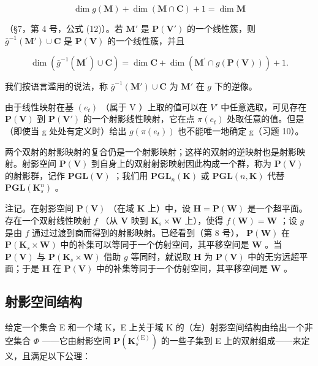 \[
\dim g (\mathbf {M}) + \dim (\mathbf {M} \cap \mathbf {C}) + 1 = \dim \mathbf {M}\tag{7}
\]

（§7，第 4 号，公式 (12)）。若 \(\mathbf{M}'\) 是 \(\mathbf{P}(\mathbf{V}')\) 的一个线性簇，则 \(\bar{g}^{-1}(\mathbf{M}') \cup \mathbf{C}\) 是 \(\mathbf{P}(\mathbf{V})\) 的一个线性簇，并且

\[
\dim (\bar {g} ^ {- 1} (\mathbf {M} ^ {\prime}) \cup \mathbf {C}) = \dim \mathbf {C} + \dim (\mathbf {M} ^ {\prime} \cap g (\mathbf {P} (\mathbf {V}))) + 1.\tag{8}
\]

我们按语言滥用的说法，称 \(\bar{g}^{-1}(\mathbf{M}') \cup \mathbf{C}\) 为 \(\mathbf{M}'\) 在 \(g\) 下的逆像。

由于线性映射在基 \((e_{t})\) （属于 V ）上取的值可以在 \(V'\) 中任意选取，可见存在 \(\mathbf{P}(\mathbf{V})\) 到 \(\mathbf{P}(\mathbf{V}')\) 的一个射影线性映射，它在点 \(\pi(e_{t})\) 处取任意的值。但是（即使当 g 处处有定义时）给出 \(g(\pi(e_{t}))\) 也不能唯一地确定 g（习题 10）。

两个双射的射影映射的复合仍是一个射影映射；这样的双射的逆映射也是射影映射。射影空间 \(\mathbf{P}(\mathbf{V})\) 到自身上的双射射影映射因此构成一个群，称为 \(\mathbf{P}(\mathbf{V})\) 的射影群，记作 \(\mathbf{PGL}(\mathbf{V})\) ；我们用 \(\mathbf{PGL}_{n}(\mathbf{K})\) 或 \(\mathbf{PGL}(n,\mathbf{K})\) 代替 \(\mathbf{PGL}(\mathbf{K}_{s}^{n})\) 。

注记。在射影空间 \(\mathbf{P}(\mathbf{V})\) （在域 \(\mathbf{K}\) 上）中，设 \(\mathbf{H} = \mathbf{P}(\mathbf{W})\) 是一个超平面。存在一个双射线性映射 \(f\) （从 \(\mathbf{V}\) 映到 \(\mathbf{K}_s \times \mathbf{W}\) 上），使得 \(f(\mathbf{W}) = \mathbf{W}\) ；设 \(g\) 是由 \(f\) 通过过渡到商而得到的射影映射。已经看到（第 8 号）， \(\mathbf{P}(\mathbf{W})\) 在 \(\mathbf{P}(\mathbf{K}_s \times \mathbf{W})\) 中的补集可以等同于一个仿射空间，其平移空间是 \(\mathbf{W}\) 。当 \(\mathbf{P}(\mathbf{V})\) 与 \(\mathbf{P}(\mathbf{K}_s \times \mathbf{W})\) 借助 \(g\) 等同时，就说取 \(\mathbf{H}\) 为 \(\mathbf{P}(\mathbf{V})\) 中的无穷远超平面；于是 \(\mathbf{H}\) 在 \(\mathbf{P}(\mathbf{V})\) 中的补集等同于一个仿射空间，其平移空间是 \(\mathbf{W}\) 。

\subsection{射影空间结构}

给定一个集合 E 和一个域 K，E 上关于域 K 的（左）射影空间结构由给出一个非空集合 \(\Phi\) ——它由射影空间 \(\mathbf{P}(\mathbf{K}_{s}^{\mathrm{(E)}})\) 的一些子集到 E 上的双射组成——来定义，且满足以下公理：

